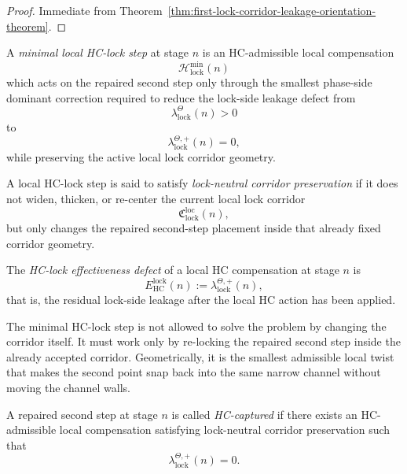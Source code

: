 \begin{proof}
Immediate from Theorem~\ref{thm:first-lock-corridor-leakage-orientation-theorem}.
\end{proof}



\begin{definition}
\label{def:minimal-local-hc-lock-step}
A \emph{minimal local HC-lock step} at stage $n$ is an HC-admissible local compensation
\[
 \mathcal H^{\min}_{\mathrm{lock}}(n)
\]
which acts on the repaired second step only through the smallest phase-side dominant correction required to reduce the lock-side leakage defect from
\[
 \lambda_{\mathrm{lock}}^{\Theta}(n)>0
\]
to
\[
 \lambda_{\mathrm{lock}}^{\Theta,+}(n)=0,
\]
while preserving the active local lock corridor geometry.
\end{definition}

\begin{definition}
\label{def:lock-neutral-corridor-preservation}
A local HC-lock step is said to satisfy \emph{lock-neutral corridor preservation} if it does not widen, thicken, or re-center the current local lock corridor
\[
 \mathfrak C_{\mathrm{lock}}^{\mathrm{loc}}(n),
\]
but only changes the repaired second-step placement inside that already fixed corridor geometry.
\end{definition}

\begin{definition}
\label{def:hc-lock-effectiveness-defect}
The \emph{HC-lock effectiveness defect} of a local HC compensation at stage $n$ is
\[
 E_{\mathrm{HC}}^{\mathrm{lock}}(n)
 :=
 \lambda_{\mathrm{lock}}^{\Theta,+}(n),
\]
that is, the residual lock-side leakage after the local HC action has been applied.
\end{definition}

\begin{remark}
\label{rem:what-the-minimal-hc-step-is-allowed-to-do}
The minimal HC-lock step is not allowed to solve the problem by changing the corridor itself. It must work only by re-locking the repaired second step inside the already accepted corridor. Geometrically, it is the smallest admissible local twist that makes the second point snap back into the same narrow channel without moving the channel walls.
\end{remark}

\begin{definition}
\label{def:hc-captured-local-repaired-second-step}
A repaired second step at stage $n$ is called \emph{HC-captured} if there exists an HC-admissible local compensation satisfying lock-neutral corridor preservation such that
\[
 \lambda_{\mathrm{lock}}^{\Theta,+}(n)=0.
\]
\end{definition}

